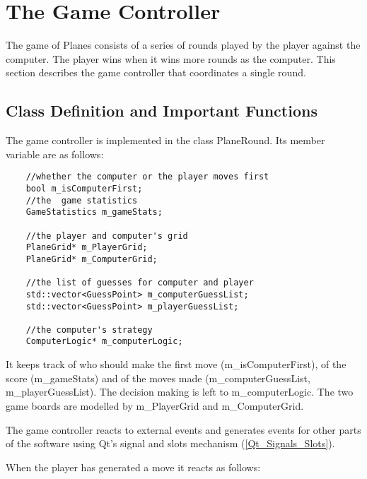 \section{The Game Controller}

The game of Planes consists of a series of rounds played by the player against the computer. The player wins when it wins more rounds as the computer. This section describes the game controller that coordinates a single round. 

\subsection {Class Definition and Important Functions}

The game controller is implemented in the class PlaneRound. Its member variable are as follows:

\begin{lstlisting}
	//whether the computer or the player moves first
	bool m_isComputerFirst;
	//the  game statistics
	GameStatistics m_gameStats;
	
	//the player and computer's grid
	PlaneGrid* m_PlayerGrid;
	PlaneGrid* m_ComputerGrid;
	
	//the list of guesses for computer and player
	std::vector<GuessPoint> m_computerGuessList;
	std::vector<GuessPoint> m_playerGuessList;
	
	//the computer's strategy
	ComputerLogic* m_computerLogic;
\end{lstlisting}

It keeps track of who should make the first move (m\_isComputerFirst), of the score (m\_gameStats) and of the moves made (m\_computerGuessList, m\_playerGuessList). The decision making is left to m\_computerLogic. The two game boards are modelled by m\_PlayerGrid and m\_ComputerGrid.

The game controller reacts to external events and generates events for other parts of the software using Qt's signal and slots mechanism (\ref{Qt_Signals_Slots}). 

When the player has generated a move it reacts as follows:

